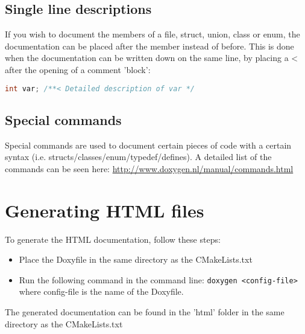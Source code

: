\documentclass{article}
\begin{document}
\subsection{Single line descriptions}
If you wish to document the members of a file, struct, union, class or enum, the documentation can be placed after the member instead of before. This is done when the documentation can be written down on the same line, by placing a < after the opening of a comment 'block': 
\begin{lstlisting}[language=cpp]
int var; /**< Detailed description of var */
\end{lstlisting}

\subsection{Special commands}
Special commands are used to document certain pieces of code with a certain syntax (i.e. structs/classes/enum/typedef/defines). A detailed list of the commands can be seen here:
\url{http://www.doxygen.nl/manual/commands.html}

\section{Generating HTML files}

To generate the HTML documentation, follow these steps:
\begin{itemize}
	\item Place the Doxyfile in the same directory as the CMakeLists.txt
	\item Run the following command in the command line:
	\texttt{doxygen <config-file>} where config-file is the name of the Doxyfile.
\end{itemize}
The generated documentation can be found in the 'html' folder in the same directory as the CMakeLists.txt
\end{document}
